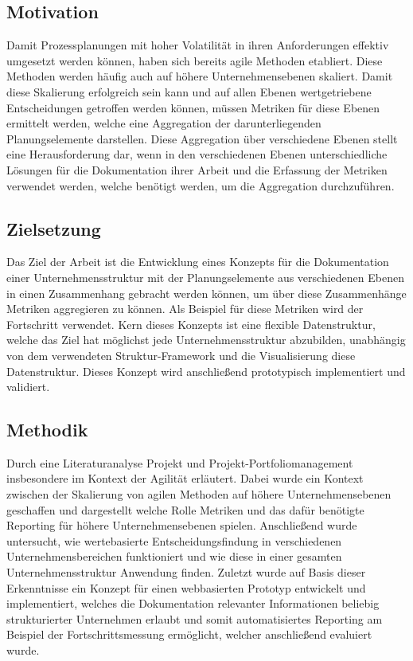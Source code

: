 \subsection{Motivation}
Damit Prozessplanungen mit hoher Volatilität in ihren Anforderungen effektiv umgesetzt werden können, haben sich bereits agile Methoden etabliert. Diese Methoden werden häufig auch auf höhere Unternehmensebenen skaliert. Damit diese Skalierung erfolgreich sein kann und auf allen Ebenen wertgetriebene Entscheidungen getroffen werden können, müssen Metriken für diese Ebenen ermittelt werden, welche eine Aggregation der darunterliegenden Planungselemente darstellen. Diese Aggregation über verschiedene Ebenen stellt eine Herausforderung dar, wenn in den verschiedenen Ebenen unterschiedliche Lösungen für die Dokumentation ihrer Arbeit und die Erfassung der Metriken verwendet werden, welche benötigt werden, um die Aggregation durchzuführen.

\subsection{Zielsetzung}
Das Ziel der Arbeit ist die Entwicklung eines Konzepts für die Dokumentation einer Unternehmensstruktur mit der Planungselemente aus verschiedenen Ebenen in einen Zusammenhang gebracht werden können, um über diese Zusammenhänge Metriken aggregieren zu können. Als Beispiel für diese Metriken wird der Fortschritt verwendet. Kern dieses Konzepts ist eine flexible Datenstruktur, welche das Ziel hat möglichst jede Unternehmensstruktur abzubilden, unabhängig von dem verwendeten Struktur-Framework und die Visualisierung diese Datenstruktur. Dieses Konzept wird anschließend prototypisch implementiert und validiert.

\subsection{Methodik}
Durch eine Literaturanalyse Projekt und Projekt-Portfoliomanagement insbesondere im Kontext der Agilität erläutert. Dabei wurde ein Kontext zwischen der Skalierung von agilen Methoden auf höhere Unternehmensebenen geschaffen und dargestellt welche Rolle Metriken und das dafür benötigte Reporting für höhere Unternehmensebenen spielen. Anschließend wurde untersucht, wie wertebasierte Entscheidungsfindung in verschiedenen Unternehmensbereichen funktioniert und wie diese in einer gesamten Unternehmensstruktur Anwendung finden. Zuletzt wurde auf Basis dieser Erkenntnisse ein Konzept für einen webbasierten Prototyp entwickelt und implementiert, welches die Dokumentation relevanter Informationen beliebig strukturierter Unternehmen erlaubt und somit automatisiertes Reporting am Beispiel der Fortschrittsmessung ermöglicht, welcher anschließend evaluiert wurde.

